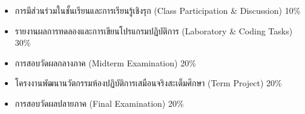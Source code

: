 \begin{tcolorbox}[enhanced, colback=white, colframe=darkSlate, colbacktitle=darkSlate,
    coltitle=white, fonttitle=\bfseries\normalsize,
    title={การวัดและประเมินผลการเรียนรู้},
    arc=2mm, boxrule=0.8pt, leftrule=4mm,
    top=8pt, bottom=8pt, left=10pt, right=10pt, before skip=8pt]
\begin{itemize}
    \item การมีส่วนร่วมในชั้นเรียนและการเรียนรู้เชิงรุก (Class Participation \& Discussion) \hfill 10\%
    \item รายงานผลการทดลองและการเขียนโปรแกรมปฏิบัติการ (Laboratory \& Coding Tasks) \hfill 30\%
    \item การสอบวัดผลกลางภาค (Midterm Examination) \hfill 20\%
    \item โครงงานพัฒนานวัตกรรมห้องปฏิบัติการเสมือนจริงสะเต็มศึกษา (Term Project) \hfill 20\%
    \item การสอบวัดผลปลายภาค (Final Examination) \hfill 20\%
\end{itemize}
\end{tcolorbox}
\clearpage

